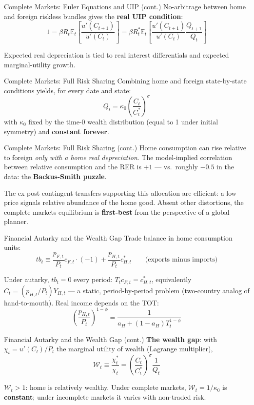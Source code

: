 \documentclass[blue]{beamer}
\newcommand{\E}{\mathbb{E}}
\begin{document}
\begin{frame}{Complete Markets: Euler Equations and UIP (cont.)}
No-arbitrage between home and foreign riskless bundles gives the \textbf{real UIP condition}:
\[
1 = \beta R_t \E_t\left[\frac{u'(C_{t+1})}{u'(C_t)}\right] = \beta R_t^* \E_t\left[\frac{u'(C_{t+1})}{u'(C_t)}\frac{Q_{t+1}}{Q_t}\right]
\]

Expected real depreciation is tied to real interest differentials and expected marginal-utility growth.
\end{frame}

\begin{frame}{Complete Markets: Full Risk Sharing}
Combining home and foreign state-by-state conditions yields, for every date and state:
\[
Q_t = \kappa_0\left(\frac{C_t}{C_t^*}\right)^{\sigma}
\]
with $\kappa_0$ fixed by the time-0 wealth distribution (equal to 1 under initial symmetry) and \textbf{constant forever}.

\end{frame}

\begin{frame}{Complete Markets: Full Risk Sharing (cont.)}
\bigskip
Home consumption can rise relative to foreign \emph{only with a home real depreciation}. The model-implied correlation between relative consumption and the RER is $+1$ --- vs.\ roughly $-0.5$ in the data: the \textbf{Backus-Smith puzzle}.

\bigskip
The ex post contingent transfers supporting this allocation are efficient: a low price signals relative abundance of the home good. Absent other distortions, the complete-markets equilibrium is \textbf{first-best} from the perspective of a global planner.
\end{frame}

\begin{frame}{Financial Autarky and the Wealth Gap}
Trade balance in home consumption units:
\[
tb_t \equiv \frac{p_{F,t}}{P_t}c_{F,t}\cdot(-1) + \frac{p_{H,t}}{P_t}c^*_{H,t} \qquad \text{(exports minus imports)}
\]

Under autarky, $tb_t = 0$ every period: $T_t c_{F,t} = c^*_{H,t}$, equivalently $C_t = (p_{H,t}/P_t)Y_{H,t}$ --- a static, period-by-period problem (two-country analog of hand-to-mouth). Real income depends on the TOT:
\[
\left(\frac{p_{H,t}}{P_t}\right)^{1-\phi} = \frac{1}{a_H + (1-a_H)T_t^{1-\phi}}
\]

\end{frame}

\begin{frame}{Financial Autarky and the Wealth Gap (cont.)}
\bigskip
\textbf{The wealth gap}: with $\chi_t = u'(C_t)/P_t$ the marginal utility of wealth (Lagrange multiplier),
\[
\mathcal{W}_t \equiv \frac{\chi_t^*}{\chi_t} = \left(\frac{C_t}{C_t^*}\right)^{\sigma}\frac{1}{Q_t}
\]

$\mathcal{W}_t > 1$: home is relatively wealthy. Under complete markets, $\mathcal{W}_t = 1/\kappa_0$ is \textbf{constant}; under incomplete markets it varies with non-traded risk.
\end{frame}
\end{document}
